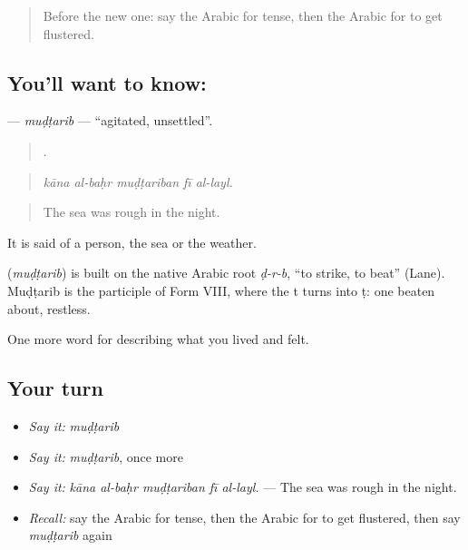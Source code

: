 \label{lesson:AR-C497-mudtarib}



\begin{quote}
Before the new one: say the Arabic for tense, then the Arabic for to get flustered.
\end{quote}

\subsection*{You'll want to know: }
\textbf{} — \emph{muḍṭarib} — \textquotedblleft{}agitated, unsettled\textquotedblright{}.

\begin{quote}
    .
\end{quote}

\begin{quote}
\emph{kāna al-baḥr muḍṭariban fī al-layl.}
\end{quote}

\begin{quote}
The sea was rough in the night.
\end{quote}

It is said of a person, the sea or the weather.

\begin{cousinweb}
\textbf{} (\emph{muḍṭarib}) is built on the native Arabic root \emph{ḍ-r-b}, \textquotedblleft{}to strike, to beat\textquotedblright{} (Lane). Muḍṭarib is the participle of Form VIII, where the t turns into ṭ: one beaten about, restless.
\end{cousinweb}

\begin{grammarlens}[title={What you've built}]
One more word for describing what you lived and felt.
\end{grammarlens}

\subsection*{Your turn}
\begin{itemize}
\raggedright
  \item \emph{Say it:} \emph{muḍṭarib}
  \item \emph{Say it:} \emph{muḍṭarib}, once more
  \item \emph{Say it:} \emph{kāna al-baḥr muḍṭariban fī al-layl.} — The sea was rough in the night.
  \item \emph{Recall:} say the Arabic for tense, then the Arabic for to get flustered, then say \emph{muḍṭarib} again
\end{itemize}

